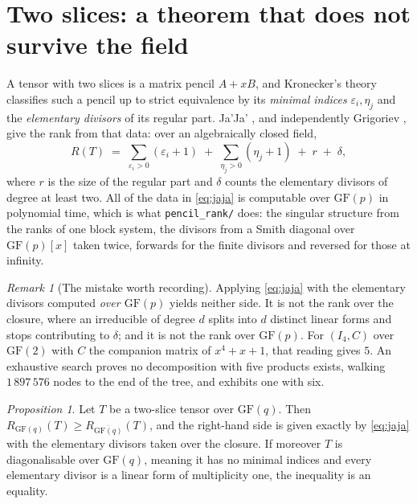 \documentclass[11pt,reqno]{amsart}
\theoremstyle{plain}
\theoremstyle{definition}
\theoremstyle{remark}
\newtheorem{proposition}[theorem]{Proposition}
\newtheorem{remark}[theorem]{Remark}
\begin{document}
\section{Two slices: a theorem that does not survive the field}\label{sec:pencil}

A tensor with two slices is a matrix pencil $A + xB$, and Kronecker's theory
classifies such a pencil up to strict equivalence by its \emph{minimal indices}
$\varepsilon_i, \eta_j$ and the \emph{elementary divisors} of its regular part.
Ja'Ja' \cite{jaja1979}, and independently Grigoriev \cite{grigoriev1978}, give
the rank from that data: over an algebraically closed field,
\begin{equation}\label{eq:jaja}
  R(T) \;=\; \sum_{\varepsilon_i > 0}(\varepsilon_i + 1)
          \;+\; \sum_{\eta_j > 0}(\eta_j + 1)
          \;+\; r \;+\; \delta,
\end{equation}
where $r$ is the size of the regular part and $\delta$ counts the elementary
divisors of degree at least two. All of the data in \eqref{eq:jaja} is
computable over $\mathrm{GF}(p)$ in polynomial time, which is what
\texttt{pencil\_rank/} does: the singular structure from the ranks of one block
system, the divisors from a Smith diagonal over $\mathrm{GF}(p)[x]$ taken twice,
forwards for the finite divisors and reversed for those at infinity.

\begin{remark}[The mistake worth recording]
Applying \eqref{eq:jaja} with the elementary divisors computed \emph{over
$\mathrm{GF}(p)$} yields neither side. It is not the rank over the closure,
where an irreducible of degree $d$ splits into $d$ distinct linear forms and
stops contributing to $\delta$; and it is not the rank over $\mathrm{GF}(p)$.
For $(I_4, C)$ over $\mathrm{GF}(2)$ with $C$ the companion matrix of $x^4 + x +
1$, that reading gives $5$. An exhaustive search proves no decomposition with
five products exists, walking $1\,897\,576$ nodes to the end of the tree, and
exhibits one with six.
\end{remark}

\begin{proposition}\label{prop:closure}
Let $T$ be a two-slice tensor over $\mathrm{GF}(q)$. Then $R_{\mathrm{GF}(q)}(T)
\ge R_{\overline{\mathrm{GF}(q)}}(T)$, and the right-hand side is given exactly
by \eqref{eq:jaja} with the elementary divisors taken over the closure. If
moreover $T$ is diagonalisable over $\mathrm{GF}(q)$, meaning it has no minimal
indices and every elementary divisor is a linear form of multiplicity one, the
inequality is an equality.
\end{proposition}
\end{document}
